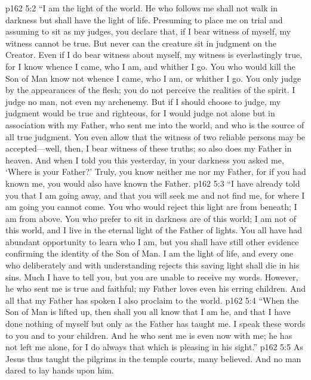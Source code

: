 \pc \vs p162 5:2 \textcolor{ubdarkred}{“I am the light of the world. He who follows me shall not walk in darkness but shall have the light of life. Presuming to place me on trial and assuming to sit as my judges, you declare that, if I bear witness of myself, my witness cannot be true. But never can the creature sit in judgment on the Creator. Even if I do bear witness about myself, my witness is everlastingly true, for I know whence I came, who I am, and whither I go. You who would kill the Son of Man know not whence I came, who I am, or whither I go. You only judge by the appearances of the flesh; you do not perceive the realities of the spirit. I judge no man, not even my archenemy. But if I should choose to judge, my judgment would be true and righteous, for I would judge not alone but in association with my Father, who sent me into the world, and who is the source of all true judgment. You even allow that the witness of two reliable persons may be accepted---well, then, I bear witness of these truths; so also does my Father in heaven. And when I told you this yesterday, in your darkness you asked me, ‘Where is your Father?’ Truly, you know neither me nor my Father, for if you had known me, you would also have known the Father.}
\vs p162 5:3 \textcolor{ubdarkred}{“I have already told you that I am going away, and that you will seek me and not find me, for where I am going you cannot come. You who would reject this light are from beneath; I am from above. You who prefer to sit in darkness are of this world; I am not of this world, and I live in the eternal light of the Father of lights. You all have had abundant opportunity to learn who I am, but you shall have still other evidence confirming the identity of the Son of Man. I am the light of life, and every one who deliberately and with understanding rejects this saving light shall die in his sins. Much I have to tell you, but you are unable to receive my words. However, he who sent me is true and faithful; my Father loves even his erring children. And all that my Father has spoken I also proclaim to the world.}\plusone
\vs p162 5:4 \textcolor{ubdarkred}{“When the Son of Man is lifted up, then shall you all know that I am he, and that I have done nothing of myself but only as the Father has taught me. I speak these words to you and to your children. And he who sent me is even now with me; he has not left me alone, for I do always that which is pleasing in his sight.”}
\pc \vs p162 5:5 As Jesus thus taught the pilgrims in the temple courts, many believed. And no man dared to lay hands upon him.

